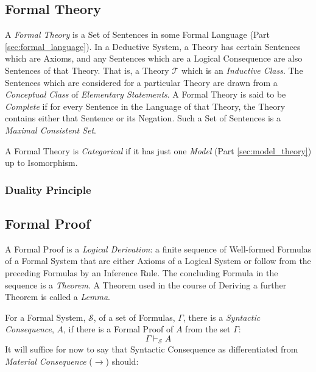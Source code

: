\documentclass{article}
\begin{document}
\subsection{Formal Theory}\label{subsec:formal_theory}

A \emph{Formal Theory} is a Set of Sentences in some Formal Language
(Part \ref{sec:formal_language}). In a Deductive System, a Theory has
certain Sentences which are Axioms, and any Sentences which are a
Logical Consequence are also Sentences of that Theory. That is, a
Theory $\mathcal{T}$ which is an \emph{Inductive Class}. The Sentences
which are considered for a particular Theory are drawn from a
\emph{Conceptual Class} of \emph{Elementary Statements}. A Formal
Theory is said to be \emph{Complete} if for every Sentence in the
Language of that Theory, the Theory contains either that Sentence or
its Negation. Such a Set of Sentences is a \emph{Maximal Consistent
  Set}.

A Formal Theory is \emph{Categorical} if it has just one \emph{Model}
(Part \ref{sec:model_theory}) up to Isomorphism.




\subsubsection{Duality Principle}\label{subsec:duality_principle}



\subsection{Formal Proof} \label{subsec:formal_proof}

A Formal Proof is a \emph{Logical Derivation}: a finite sequence of
Well-formed Formulas of a Formal System that are either Axioms of a
Logical System or follow from the preceding Formulas by an Inference
Rule. The concluding Formula in the sequence is a \emph{Theorem}. A
Theorem used in the course of Deriving a further Theorem is called a
\emph{Lemma}.

For a Formal System, $\mathcal{S}$, of a set of Formulas, $\Gamma$,
there is a \emph{Syntactic Consequence}, $A$, if there is a
Formal Proof of $A$ from the set $\Gamma$:
\[
    \Gamma \vdash_{\mathcal{S}} A
\]
It will suffice for now to say that Syntactic Consequence as
differentiated from \emph{Material Consequence} ($\rightarrow$)
should:
\end{document}
